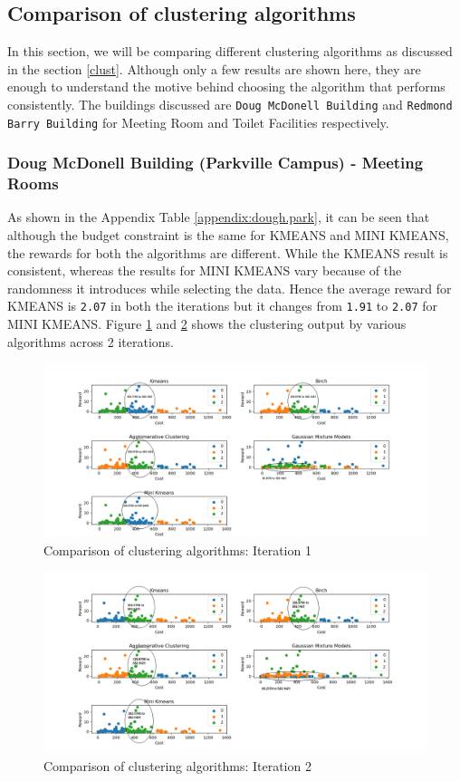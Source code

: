 \subsection{Comparison of clustering algorithms}
In this section, we will be comparing different clustering algorithms as discussed in the section \ref{clust}. Although only a few results are shown here, they are enough to understand the motive behind choosing the algorithm that performs consistently. The buildings discussed are \texttt{Doug McDonell Building} and \texttt{Redmond Barry Building} for Meeting Room and Toilet Facilities respectively.

\subsubsection {Doug McDonell Building (Parkville Campus) - Meeting Rooms}

As shown in the Appendix Table \ref{appendix:dough.park}, it can be seen that although the budget constraint is the same for KMEANS and MINI KMEANS, the rewards for both the algorithms are different. While the KMEANS result is consistent, whereas the results for MINI KMEANS vary because of the randomness it introduces while selecting the data. Hence the average reward for KMEANS is \texttt{2.07} in both the iterations but it changes from \texttt{1.91} to \texttt{2.07} for MINI KMEANS. Figure \ref{fig:iter1} and \ref{fig:iter2} shows the clustering output by various algorithms across 2 iterations.

\begin{figure}[H]
\centering
\includegraphics[width=15cm]{resources/168_14.png}
\caption{Comparison of clustering algorithms: Iteration 1}
\label{fig:iter1}
\end{figure}

\begin{figure}[H]
\centering
\includegraphics[width=15cm]{resources/168_2.png}
\caption{Comparison of clustering algorithms: Iteration 2}
\label{fig:iter2}
\end{figure}

